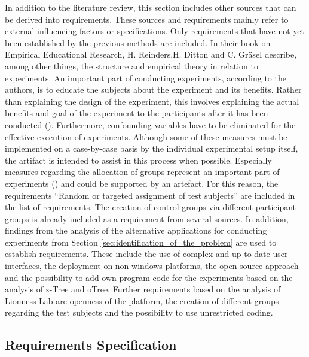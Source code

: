   In addition to the literature review, this section includes other sources that can be derived into requirements. These sources and requirements mainly refer to external influencing factors or specifications. Only requirements that have not yet been established by the previous methods are included.  
  In their book on Empirical Educational Research, H. Reinders,H. Ditton and C. Gräsel describe, among other things, the structure and empirical theory in relation to experiments. An important part of conducting experiments, according to the authors, is to educate the subjects about the experiment and its benefits. Rather than explaining the design of the experiment, this involves explaining the actual benefits and goal of the experiment to the participants after it has been conducted (\cite{Gniewosz.2011}). Furthermore, confounding variables have to be eliminated for the effective execution of experiments. Although some of these measures must be implemented on a case-by-case basis by the individual experimental setup itself, the artifact is intended to assist in this process when possible. Especially measures regarding the allocation of groups represent an important part of experiments (\cite{Gniewosz.2011}) and could be supported by an artefact. For this reason, the requirements \enquote{Random or targeted assignment of test subjects} are included in the list of requirements. The creation of control groups via different participant groups is already included as a requirement from several sources. In addition, findings from the analysis of the alternative applications for conducting experiments from Section \ref{sec:identification_of_the_problem} are used to establish requirements. These include the use of complex and up to date user interfaces, the deployment on non windows platforms, the open-source approach and the possibility to add own program code for the experiments based on the analysis of z-Tree and oTree. Further requirements based on the analysis of Lionness Lab are openness of the platform, the creation of different groups regarding the test subjects and the possibility to use unrestricted coding.

\subsection{Requirements Specification}\label{subsec:reqSpec}

